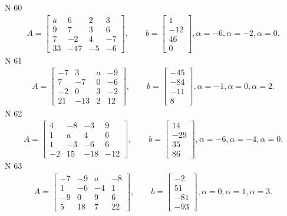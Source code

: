 \documentclass[11pt]{report}
\begin{document}
N 60
\begin{align*}
 A = \left[\begin{matrix}a & 6 & 2 & 3\\9 & 7 & 3 & 6\\7 & -2 & 4 & -7\\33 & -17 & -5 & -6\end{matrix}\right],
    \qquad b = \left[\begin{matrix}1\\-12\\46\\0\end{matrix}\right], \alpha = -6, \alpha = -2, \alpha = 0. 
 \end{align*}
N 61
\begin{align*}
 A = \left[\begin{matrix}-7 & 3 & a & -9\\7 & -7 & 0 & -6\\-2 & 0 & 3 & -2\\21 & -13 & 2 & 12\end{matrix}\right],
    \qquad b = \left[\begin{matrix}-45\\-84\\-11\\8\end{matrix}\right], \alpha = -1, \alpha = 0, \alpha = 2. 
 \end{align*}
N 62
\begin{align*}
 A = \left[\begin{matrix}4 & -8 & -3 & 9\\1 & a & 4 & 6\\1 & -3 & -6 & 6\\-2 & 15 & -18 & -12\end{matrix}\right],
    \qquad b = \left[\begin{matrix}14\\-29\\35\\86\end{matrix}\right], \alpha = -6, \alpha = -4, \alpha = 0. 
 \end{align*}
N 63
\begin{align*}
 A = \left[\begin{matrix}-7 & -9 & a & -8\\1 & -6 & -4 & 1\\-9 & 0 & 9 & 6\\5 & 18 & 7 & 22\end{matrix}\right],
    \qquad b = \left[\begin{matrix}-2\\51\\-81\\-93\end{matrix}\right], \alpha = 0, \alpha = 1, \alpha = 3. 
 \end{align*}
\end{document}
